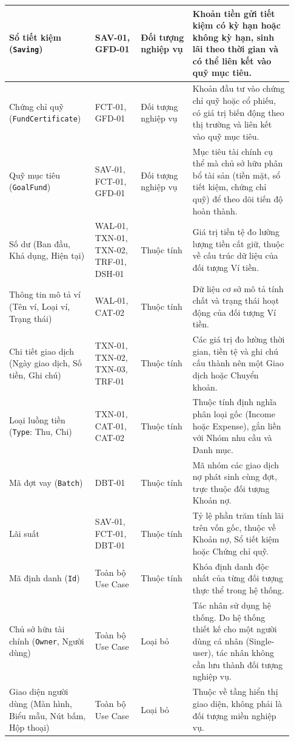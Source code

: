 \documentclass[11pt,a4paper]{article}
\newcommand{\code}[1]{\texttt{#1}}
\newenvironment{smalltable}{\begingroup\footnotesize\renewcommand{\arraystretch}{1.25}\setlength{\tabcolsep}{3pt}}{\endgroup}
\begin{document}
\begin{smalltable}
\begin{longtable}{|L{0.28\linewidth}|L{0.15\linewidth}|L{0.17\linewidth}|L{0.33\linewidth}|}
Sổ tiết kiệm (\code{Saving}) & SAV-01, GFD-01 & Đối tượng nghiệp vụ & Khoản tiền gửi tiết kiệm có kỳ hạn hoặc không kỳ hạn, sinh lãi theo thời gian và có thể liên kết vào quỹ mục tiêu. \\ \hline
Chứng chỉ quỹ (\code{FundCertificate}) & FCT-01, GFD-01 & Đối tượng nghiệp vụ & Khoản đầu tư vào chứng chỉ quỹ hoặc cổ phiếu, có giá trị biến động theo thị trường và liên kết vào quỹ mục tiêu. \\ \hline
Quỹ mục tiêu (\code{GoalFund}) & SAV-01, FCT-01, GFD-01 & Đối tượng nghiệp vụ & Mục tiêu tài chính cụ thể mà chủ sở hữu phân bổ tài sản (tiền mặt, sổ tiết kiệm, chứng chỉ quỹ) để theo dõi tiến độ hoàn thành. \\ \hline
Số dư (Ban đầu, Khả dụng, Hiện tại) & WAL-01, TXN-01, TXN-02, TRF-01, DSH-01 & Thuộc tính & Giá trị tiền tệ đo lường lượng tiền cất giữ, thuộc về cấu trúc dữ liệu của đối tượng Ví tiền. \\ \hline
Thông tin mô tả ví (Tên ví, Loại ví, Trạng thái) & WAL-01, CAT-02 & Thuộc tính & Dữ liệu cơ sở mô tả tính chất và trạng thái hoạt động của đối tượng Ví tiền. \\ \hline
Chi tiết giao dịch (Ngày giao dịch, Số tiền, Ghi chú) & TXN-01, TXN-02, TXN-03, TRF-01 & Thuộc tính & Các giá trị đo lường thời gian, tiền tệ và ghi chú cấu thành nên một Giao dịch hoặc Chuyển khoản. \\ \hline
Loại luồng tiền (\code{Type}: Thu, Chi) & TXN-01, CAT-01, CAT-02 & Thuộc tính & Thuộc tính định nghĩa phân loại gốc (Income hoặc Expense), gắn liền với Nhóm nhu cầu và Danh mục. \\ \hline
Mã đợt vay (\code{Batch}) & DBT-01 & Thuộc tính & Mã nhóm các giao dịch nợ phát sinh cùng đợt, trực thuộc đối tượng Khoản nợ. \\ \hline
Lãi suất & SAV-01, FCT-01, DBT-01 & Thuộc tính & Tỷ lệ phần trăm tính lãi trên vốn gốc, thuộc về Khoản nợ, Sổ tiết kiệm hoặc Chứng chỉ quỹ. \\ \hline
Mã định danh (\code{Id}) & Toàn bộ Use Case & Thuộc tính & Khóa định danh độc nhất của từng đối tượng thực thể trong hệ thống. \\ \hline
Chủ sở hữu tài chính (\code{Owner}, Người dùng) & Toàn bộ Use Case & Loại bỏ & Tác nhân sử dụng hệ thống. Do hệ thống thiết kế cho một người dùng cá nhân (Single-user), tác nhân không cần lưu thành đối tượng nghiệp vụ. \\ \hline
Giao diện người dùng (Màn hình, Biểu mẫu, Nút bấm, Hộp thoại) & Toàn bộ Use Case & Loại bỏ & Thuộc về tầng hiển thị giao diện, không phải là đối tượng miền nghiệp vụ. \\ \hline

\end{longtable}
\end{smalltable}
\end{document}
